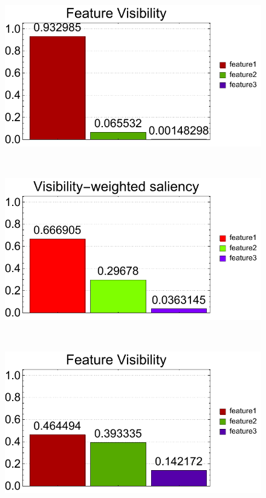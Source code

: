 \begin{figure}
	\begin{minipage}{.25\textwidth}
		\includegraphics[width=1\linewidth]{figures/CT-Knee_naive_visibility_chart}
		\subcaption{}
	\end{minipage}~
	\begin{minipage}{.25\textwidth}
		\includegraphics[width=1\linewidth]{figures/CT-Knee_naive_visibility_saliency_weighted_chart}
		\subcaption{}
	\end{minipage}~
	\begin{minipage}{.25\textwidth}
		\includegraphics[width=1\linewidth]{figures/CT-Knee_naive_optimized_linesearch_visibility_chart}

\end{minipage}
\end{figure}

